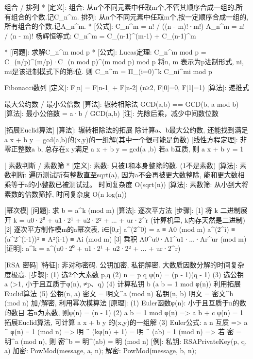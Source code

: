 
组合 / 排列 
*	[定义]: 组合: 从n个不同元素中任取m个,不管其顺序合成一组的,所有组合的个数.记C_n^m.
			排列: 从n个不同元素中任取m个,按一定顺序合成一组的,所有组合的个数.记A_n^m.
*	[公式]: C_n^m = n! / ((n - m)!·m!)
			A_n^m = n! / (n - m)!
			杨辉恒等式: C_n^m = C_(n-1)^(m-1) + C_(n-1)^m
			
*	[问题]: 求解C_n^m mod p
*	[公式]: Lucas定理: C_n^m mod p = C_(n/p)^(m/p)·C_(n mod p)^(m mod p) mod p
			将n, m 表示为p进制形式, ni, mi是该进制模式下的第i位.
			则 C_n^m = Π_(i=0)^k  C_ni^mi mod p

Fibonacci数列
[定义]: F[n] = F[n-1] + F[n-2]		(n≥2, F[0]=0, F[1]=1)
[算法]: 递推式

最大公约数 / 最小公倍数
[算法]: 辗转相除法 GCD(a,b) == GCD(b, a mod b)
[算法]: 最小公倍数 = a·b / GCD(a,b)
[注]: 先除后乘，减少中间数位数

[拓展Euclid算法]
	[算法]: 辗转相除法的拓展
			除计算a、b最大公约数, 还能找到满足a x + b y = gcd(a,b)的(x,y)的一组解(其中一个很可能是负数)
	[线性方程定理]: 
		非零正整数a b, 总存在x y满足 a x + b y = gcd(a ,b)
		若a b互质, 则 a x + b y = 1

[						素数判断 / 素数筛
*	[定义]: 素数: 只被1和本身整除的数. (1不是素数)
	[算法]: 素数判断: 遍历测试所有整数直至sqrt(a), 
			因为a不会再被更大数整除, 能和更大数相乘等于a的小整数已被测试过。
			时间复杂度 O(sqrt(n))
	[算法]: 素数筛: 从小到大将素数的倍数筛掉, 时间复杂度 O(n log(n))


[幂次模]
[问题]: 求 b = a^k (mod m)
[算法]: 逐次平方法
[步骤]:
	[1] 将 k 二进制展开  k = u0·2⁰ + u1·2¹ + u2·2² + ... + ur·2^r
			(计算机里, k内存天然是二进制)
	[2] 逐次平方制作模m的a幂次表, i∈[0,r]
			a^(2^0) = a ≡ A0 (mod m)
			a^(2^i) ≡ (a^2^(i-1))² ≡ A²(i-1) ≡ Ai (mod m)
	[3] 乘积  A0^u0·A1^u1·...·Ar^ur  (mod m)
[证明]: a^k = a^(u0·2⁰ + u1·2¹ + u2·2² + ... + ur·2^r)

[RSA 密码]
	[特征]: 非对称密码. 公钥加密, 私钥解密.
			大数质因数分解的时间复杂度极高.
	[步骤]:
		(1) 选2个大素数 p,q 
		(2) n = p q
			φ(n) = (p - 1)(q - 1)
		(3) 选公钥 a	(>1, 小于且互质于φ(n), ≠p、q)
		(4) 计算私钥 b	(a b = 1 mod φ(n))
			利用拓展Euclid算法
		(5) 公钥(n, a)		密文 = 明文^a (mod n)
			私钥(n, b)		明文 = 密文^b (mod n)
			加/解密, 利用幂次模算法
	[原理]:
		(1) Euler函数φ(n): 小于且互质于n的数的数目
			若n为素数, 则φ(n) = (n - 1)
		(2) a b = 1 mod φ(n)  =>  a b + c φ(n) = 1
			拓展Euclid算法, 可计算 a x + b y 的(x,y)的一组解
		(3) Euler公式: a n 互质 => a ^ φ(n) ≡ 1 (mod n)
			=> 明 ^ (kφ(n) + 1) = 明 ^ (ab) ≡ 1 (mod n)
			=> 若 密 = 明^a (mod n), 则 密^b = 明^(ab) = 明 (mod n)
	[例]:
		私钥: RSAPrivateKey(p, q, a)
		加密: PowMod(message, a, n);
		解密: PowMod(message, b, n);

